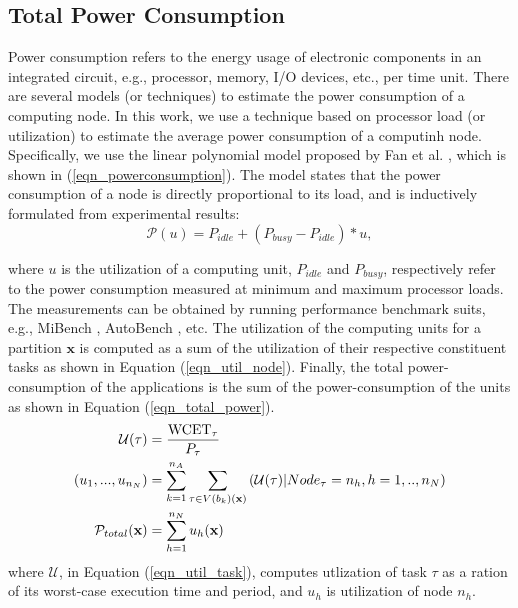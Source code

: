 \subsection{Total Power Consumption}
Power consumption refers to the energy usage of electronic components in an integrated circuit, e.g., processor, memory, I/O devices, etc., per time unit. 
There are several models (or techniques) to estimate the power consumption of a computing node. In this work, we use a technique based on processor load (or utilization) to estimate the average power consumption of a computinh node. Specifically, we use the linear polynomial model proposed by Fan et al. \cite{Fan2007PowerComputer}, which is shown in (\ref{eqn_powerconsumption}). The model states that the power consumption of a node is directly proportional to its load, and is inductively formulated from experimental results:
\begin{equation}
\label{eqn_powerconsumption}
\mathcal{P}(u)=P_{idle} + (P_{busy}-P_{idle})*u,
\end{equation}

where $u$ is the utilization of a computing unit, $P_{idle}$ and $P_{busy}$, respectively refer to the power consumption measured at minimum and maximum processor loads. The measurements can be obtained by running performance benchmark suits, e.g., MiBench \cite{Guthaus2001MiBench:Suite}, AutoBench \cite{EMBC2018AutoBenchProcessors}, etc. The utilization of the computing units for a partition $\textbf{x}$ is computed as a sum of the utilization of their respective constituent tasks as shown in Equation (\ref{eqn_util_node}). Finally, the total power-consumption of the applications is the sum of the power-consumption of the units as shown in Equation (\ref{eqn_total_power}).
\begin{align}
\label{eqn_util_task}
\mathcal{U}(\tau)              & =  \frac{\mathrm{WCET}_\tau}{P_\tau}\\
\label{eqn_util_node}
(u_1,...,u_{n_N})&=\sum_{k=1}^{n_A}\sum_{\tau\in V(b_{k})(\textbf{x})}{(\mathcal{U}(\tau)|Node_\tau=n_h, h=1,..,n_{N})}\\
\label{eqn_total_power}
\mathcal{P}_{total}(\textbf{x})  &=\sum_{h=1}^{n_N}{u_h(\textbf{x})}  
\end{align}
where $\mathcal{U}$, in Equation (\ref{eqn_util_task}), computes utlization of task $\tau$ as a ration of its worst-case execution time and period, and $u_h$ is utilization of node $n_h$.


